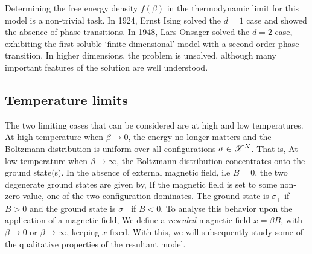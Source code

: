 \documentclass[letterpaper,english,10pt]{article}
\begin{document}
Determining the free energy density $f(\beta)$ in the thermodynamic limit for this model is a non-trivial task. In 1924, Ernst Ising solved the $d=1$ case and showed the absence of phase transitions. 
In 1948, Lars Onsager solved the $d=2$ case, exhibiting the first soluble `finite-dimensional' model with a second-order phase transition. 
In higher dimensions, the problem is unsolved, although many important features of the solution are well understood.

\subsection{Temperature limits}
The two limiting cases that can be considered are at high and low temperatures. 
At high temperature when $\beta \to 0$, the energy no longer matters and the Boltzmann distribution is uniform over all configurations $\sigma \in \mathscr{X}^N$. 
That is, 
At low temperature when $\beta \to \infty$, 
the Boltzmann distribution concentrates onto the ground state(s). 
In the absence of external magnetic field, i.e $B=0$, the two degenerate ground states are given by,
If the magnetic field is set to some non-zero value, one of the two configuration dominates. 
The ground state is $\sigma_+$ if $B>0$ and the ground state is $\sigma_-$ if $B<0$.
%
To analyse this behavior upon the application of a magnetic field, 
We define a \textit{rescaled} magnetic field $x=\beta B$, with $\beta \to 0$ or $\beta \to \infty$, keeping $x$ fixed. 
With this, we will subsequently study some of the qualitative properties of the resultant model.
\end{document}
